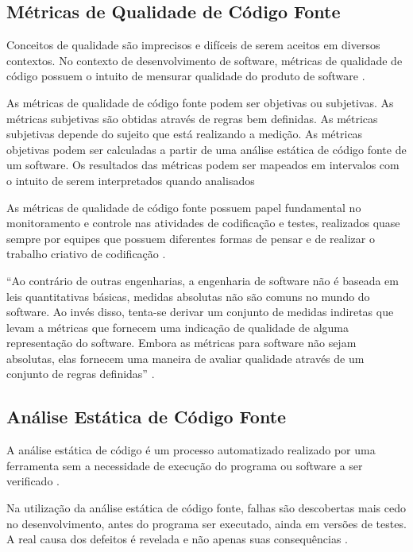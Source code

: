 \subsection{Métricas de Qualidade de Código Fonte}

Conceitos de qualidade são imprecisos e difíceis de serem aceitos em diversos contextos. No contexto de desenvolvimento de software, métricas de qualidade de código possuem o intuito de mensurar qualidade do produto de software \cite[pág.~1]{bueno2011}.

As métricas de qualidade de código fonte podem ser objetivas ou subjetivas. As métricas subjetivas são obtidas através de regras bem definidas. As métricas subjetivas depende do sujeito que está realizando a medição. As métricas objetivas podem ser calculadas a partir de uma análise estática de código fonte de um software. Os resultados das métricas podem ser mapeados em intervalos com o intuito de serem interpretados quando analisados \cite[pág.~14]{meirelles2013}

As métricas de qualidade de código fonte possuem papel fundamental no monitoramento e controle nas atividades de codificação e testes, realizados quase sempre por equipes que possuem diferentes formas de pensar e de realizar o trabalho criativo de codificação \cite[pág.~341]{sommerville}.

\begin{citacao}
“Ao contrário de outras engenharias, a engenharia de software não é baseada em leis quantitativas básicas, medidas absolutas não são comuns no mundo do software. Ao invés disso, tenta-se derivar um conjunto de medidas indiretas que levam a métricas que fornecem uma indicação de qualidade de alguma representação do software. Embora as métricas para software não sejam absolutas, elas fornecem uma maneira de avaliar qualidade através de um conjunto de regras definidas” \cite[pág.~]{bueno2011}.
\end{citacao}

\subsection{Análise Estática de Código Fonte}

A análise estática de código é um processo automatizado realizado por uma ferramenta sem a necessidade de execução do programa ou software a ser verificado \cite[pág.~64]{chess2007}.

Na utilização da análise estática de código fonte, falhas são descobertas mais cedo no desenvolvimento, antes do programa ser executado, ainda em versões de testes. A real causa dos defeitos é revelada e não apenas suas consequências \cite[pág.~19]{melo2011}.

